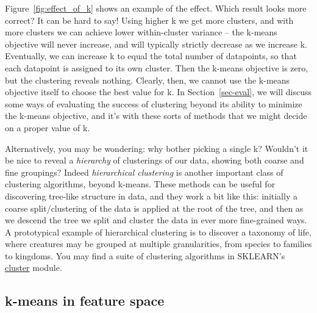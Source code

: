 Figure~\ref{fig:effect_of_k} shows an example of the effect.  Which
result looks more correct? It can be hard to say! Using higher k we
get more clusters, and with more clusters we can achieve lower
within-cluster variance -- the k-means objective will never increase,
and will typically strictly decrease as we increase k. Eventually, we
can increase k to equal the total number of datapoints, so that each
datapoint is assigned to its own cluster. Then the k-means objective
is zero, but the clustering reveals nothing.  Clearly, then, we cannot
use the k-means objective itself to choose the best value for k. In
Section~\ref{sec-eval}, we will discuss some ways of evaluating the
success of clustering beyond its ability to minimize the k-means
objective, and it's with these sorts of methods that we might decide
on a proper value of k.

Alternatively, you may be wondering: why bother picking a single k?
Wouldn't it be nice to reveal a \textit{hierarchy} of clusterings of
our data, showing both coarse and fine groupings? Indeed
\textit{hierarchical clustering}  is another important class of
clustering algorithms, beyond k-means. These methods can be useful for
discovering tree-like structure in data, and they work a bit like this: initially a coarse
split/clustering of the data is applied at the root of the tree, and then as we
descend the tree we split and cluster the data in ever more fine-grained ways. A
prototypical example of hierarchical clustering is to discover a
taxonomy of life, where creatures may be grouped at multiple
granularities, from species to families to kingdoms. You may find a suite of 
clustering algorithms in SKLEARN's 
\href{https://scikit-learn.org/1.5/modules/clustering.html}{cluster} module.





\subsection{k-means in feature space}

